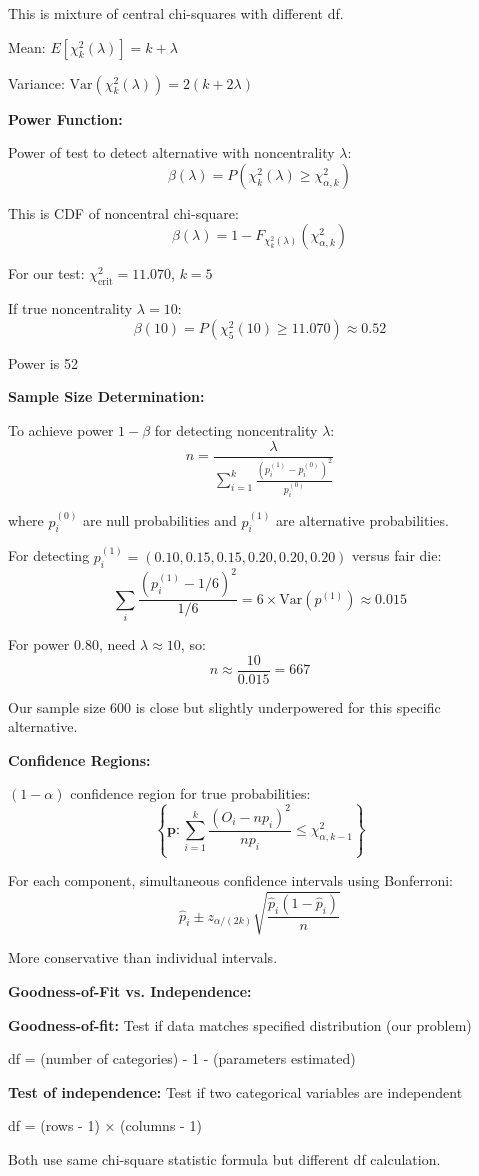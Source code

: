 \documentclass[12pt]{article}
\begin{document}
\begin{explanation}
This is mixture of central chi-squares with different df.

Mean: $E[\chi^2_k(\lambda)] = k + \lambda$

Variance: $\text{Var}(\chi^2_k(\lambda)) = 2(k + 2\lambda)$

\textbf{Power Function:}

Power of test to detect alternative with noncentrality $\lambda$:
\[
\beta(\lambda) = P(\chi^2_k(\lambda) \geq \chi^2_{\alpha, k})
\]

This is CDF of noncentral chi-square:
\[
\beta(\lambda) = 1 - F_{\chi^2_k(\lambda)}(\chi^2_{\alpha, k})
\]

For our test: $\chi^2_{\text{crit}} = 11.070$, $k = 5$

If true noncentrality $\lambda = 10$:
\[
\beta(10) = P(\chi^2_5(10) \geq 11.070) \approx 0.52
\]

Power is 52%

\textbf{Sample Size Determination:}

To achieve power $1-\beta$ for detecting noncentrality $\lambda$:
\[
n = \frac{\lambda}{\sum_{i=1}^k \frac{(p_i^{(1)} - p_i^{(0)})^2}{p_i^{(0)}}}
\]

where $p_i^{(0)}$ are null probabilities and $p_i^{(1)}$ are alternative probabilities.

For detecting $p_i^{(1)} = (0.10, 0.15, 0.15, 0.20, 0.20, 0.20)$ versus fair die:
\[
\sum_i \frac{(p_i^{(1)} - 1/6)^2}{1/6} = 6 \times \text{Var}(p^{(1)}) \approx 0.015
\]

For power 0.80, need $\lambda \approx 10$, so:
\[
n \approx \frac{10}{0.015} = 667
\]

Our sample size 600 is close but slightly underpowered for this specific alternative.

\textbf{Confidence Regions:}

$(1-\alpha)$ confidence region for true probabilities:
\[
\left\{\mathbf{p}: \sum_{i=1}^k \frac{(O_i - np_i)^2}{np_i} \leq \chi^2_{\alpha, k-1}\right\}
\]

For each component, simultaneous confidence intervals using Bonferroni:
\[
\hat{p}_i \pm z_{\alpha/(2k)}\sqrt{\frac{\hat{p}_i(1-\hat{p}_i)}{n}}
\]

More conservative than individual intervals.

\textbf{Goodness-of-Fit vs. Independence:}

\textbf{Goodness-of-fit:} Test if data matches specified distribution (our problem)

df = (number of categories) - 1 - (parameters estimated)

\textbf{Test of independence:} Test if two categorical variables are independent

df = (rows - 1) × (columns - 1)

Both use same chi-square statistic formula but different df calculation.

\end{explanation}
\end{document}
